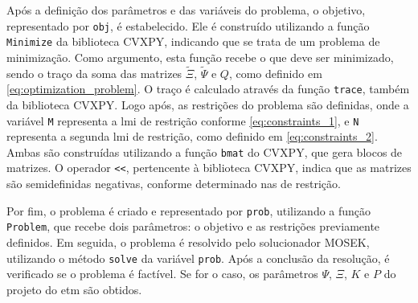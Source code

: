 Após a definição dos parâmetros e das variáveis do problema, o objetivo, representado por \texttt{obj}, é estabelecido. Ele é construído utilizando a função \texttt{Minimize} da biblioteca CVXPY, indicando que se trata de um problema de minimização. Como argumento, esta função recebe o que deve ser minimizado, sendo o traço da soma das matrizes $\tilde{\Xi}$, $\tilde{\Psi}$ e $Q$, como definido em \eqref{eq:optimization_problem}. O traço é calculado através da função \texttt{trace}, também da biblioteca CVXPY. Logo após, as restrições do problema são definidas, onde a variável \texttt{M} representa a \acrshort{lmi} de restrição conforme \eqref{eq:constraints_1}, e \texttt{N} representa a segunda \acrshort{lmi} de restrição, como definido em \eqref{eq:constraints_2}. Ambas são construídas utilizando a função \texttt{bmat} do CVXPY, que gera blocos de matrizes. O operador \texttt{<<}, pertencente à biblioteca CVXPY, indica que as matrizes são semidefinidas negativas, conforme determinado nas  de restrição.

Por fim, o problema é criado e representado por \texttt{prob}, utilizando a função \texttt{Problem}, que recebe dois parâmetros: o objetivo e as restrições previamente definidos. Em seguida, o problema é resolvido pelo solucionador MOSEK, utilizando o método \texttt{solve} da variável \texttt{prob}. Após a conclusão da resolução, é verificado se o problema é factível. Se for o caso, os parâmetros $\Psi$, $\Xi$, $K$ e $P$ do projeto do \acrshort{etm} são obtidos.